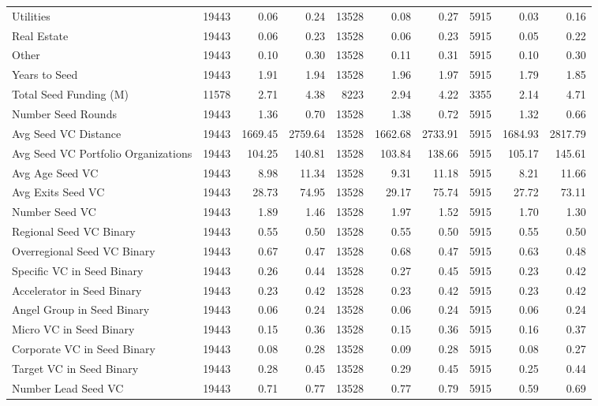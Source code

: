 {\begin{table}[!h]
{\begin{tabular}[t]{lrrrrrrrrr}
Utilities & 19443 & 0.06 & 0.24 & 13528 & 0.08 & 0.27 & 5915 & 0.03 & 0.16\\
Real Estate & 19443 & 0.06 & 0.23 & 13528 & 0.06 & 0.23 & 5915 & 0.05 & 0.22\\
Other & 19443 & 0.10 & 0.30 & 13528 & 0.11 & 0.31 & 5915 & 0.10 & 0.30\\
Years to Seed & 19443 & 1.91 & 1.94 & 13528 & 1.96 & 1.97 & 5915 & 1.79 & 1.85\\
\addlinespace
Total Seed Funding (M) & 11578 & 2.71 & 4.38 & 8223 & 2.94 & 4.22 & 3355 & 2.14 & 4.71\\
Number Seed Rounds & 19443 & 1.36 & 0.70 & 13528 & 1.38 & 0.72 & 5915 & 1.32 & 0.66\\
Avg Seed VC Distance & 19443 & 1669.45 & 2759.64 & 13528 & 1662.68 & 2733.91 & 5915 & 1684.93 & 2817.79\\
Avg Seed VC Portfolio Organizations & 19443 & 104.25 & 140.81 & 13528 & 103.84 & 138.66 & 5915 & 105.17 & 145.61\\
Avg Age Seed VC & 19443 & 8.98 & 11.34 & 13528 & 9.31 & 11.18 & 5915 & 8.21 & 11.66\\
\addlinespace
Avg Exits Seed VC & 19443 & 28.73 & 74.95 & 13528 & 29.17 & 75.74 & 5915 & 27.72 & 73.11\\
Number Seed VC & 19443 & 1.89 & 1.46 & 13528 & 1.97 & 1.52 & 5915 & 1.70 & 1.30\\
Regional Seed VC Binary & 19443 & 0.55 & 0.50 & 13528 & 0.55 & 0.50 & 5915 & 0.55 & 0.50\\
Overregional Seed VC Binary & 19443 & 0.67 & 0.47 & 13528 & 0.68 & 0.47 & 5915 & 0.63 & 0.48\\
Specific VC in Seed Binary & 19443 & 0.26 & 0.44 & 13528 & 0.27 & 0.45 & 5915 & 0.23 & 0.42\\
\addlinespace
Accelerator in Seed Binary & 19443 & 0.23 & 0.42 & 13528 & 0.23 & 0.42 & 5915 & 0.23 & 0.42\\
Angel Group in Seed Binary & 19443 & 0.06 & 0.24 & 13528 & 0.06 & 0.24 & 5915 & 0.06 & 0.24\\
Micro VC in Seed Binary & 19443 & 0.15 & 0.36 & 13528 & 0.15 & 0.36 & 5915 & 0.16 & 0.37\\
Corporate VC in Seed Binary & 19443 & 0.08 & 0.28 & 13528 & 0.09 & 0.28 & 5915 & 0.08 & 0.27\\
Target VC in Seed Binary & 19443 & 0.28 & 0.45 & 13528 & 0.29 & 0.45 & 5915 & 0.25 & 0.44\\
\addlinespace
Number Lead Seed VC & 19443 & 0.71 & 0.77 & 13528 & 0.77 & 0.79 & 5915 & 0.59 & 0.69\\

\end{tabular}}
\end{table}}
